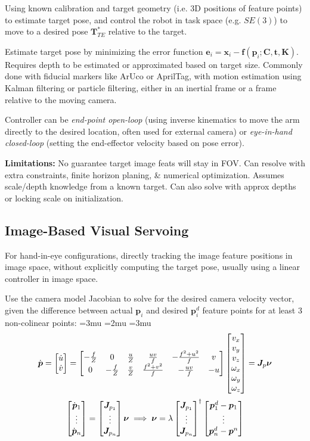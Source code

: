 \documentclass[twocolumn, 10pt]{extarticle}
\begin{document}
Using known calibration and target geometry (i.e. 3D positions of feature points) to estimate target pose, and control
the robot in task space (e.g. $SE(3)$) to move to a desired pose \(\bm T_{TE}^*\) relative to the target.

Estimate target pose by minimizing the error function $\bm e_i = \bm x_i - \bm f(\bm p_i; \bm C, \bm t, \bm K)$.
Requires depth to be estimated or approximated based on target size. Commonly done with fiducial markers like ArUco or
AprilTag, with motion estimation using Kalman filtering or particle filtering, either in an inertial frame or a frame
relative to the moving camera.

Controller can be \textit{end-point open-loop} (using inverse kinematics to move the arm directly to the desired
location, often used for external camera) or \textit{eye-in-hand closed-loop} (setting the end-effector velocity based
on pose error).

\textbf{Limitations:} No guarantee target image feats will stay in FOV. Can resolve with extra constraints, finite
horizon planing, \& numerical optimization. Assumes scale/depth knowledge from a known target. Can also solve with
approx depths or locking scale on initialization.

\subsection{Image-Based Visual Servoing}

For hand-in-eye configurations, directly tracking the image feature positions in image space, without explicitly
computing the target pose, usually using a linear controller in image space.

Use the camera model Jacobian to solve for the desired camera velocity vector, given the difference between actual \(\bm
p_i\) and desired \(\bm p_i^d\) feature points for at least 3 non-colinear points:
\begingroup
\everymath{\displaystyle}
\thinmuskip=3mu       %
\medmuskip=2mu        %
\thickmuskip=3mu      %
\setlength{\arraycolsep}{2pt}
\[\dot{\bm p} = \cvec{\dot u}{\dot v} = \mat{\mrow{-\frac{f}{Z}}{0}{\frac{u}{Z}}{\frac{uv}{f}}{-\frac{f^2 + u^2}{f}}{v}\mrow{0}{-\frac{f}{Z}}{\frac{v}{Z}}{\frac{f^2 + v^2}{f}}{-\frac{uv}{f}}{-u}}\cvec{v_x}{v_y}{v_z}{\omega _x}{\omega _y}{\omega _z} = \bm J_p\bm\nu\]
\[\cvec{\dot{\bm p}_1}{\vdots}{\dot{\bm p}_n} = \cvec{\bm J_{p_1}}{\vdots}{\bm J_{p_n}}\bm\nu \implies \bm\nu = \lambda\cvec{\bm J_{p_1}}{\vdots}{\bm J_{p_n}}^\dagger\cvec{\bm p_1^d - \bm p_1}{\vdots}{\bm p_n^d - \bm p^n}\]
\endgroup
\end{document}

